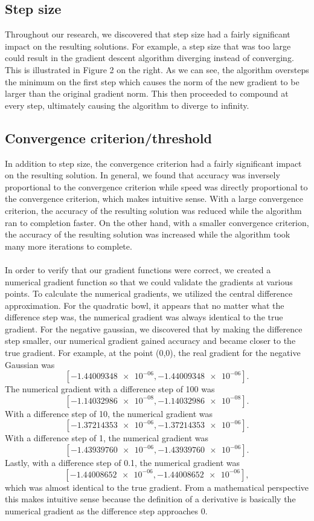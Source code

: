 \documentclass{article}
\begin{document}
\subsection{Step size}
Throughout our research, we discovered that step size had a fairly significant impact on the resulting solutions. For example, a step size that was too large could result in the gradient descent algorithm diverging instead of converging. This is illustrated in Figure 2 on the right. As we can see, the algorithm oversteps the minimum on the first step which causes the norm of the new gradient to be larger than the original gradient norm. This then proceeded to compound at every step, ultimately causing the algorithm to diverge to infinity.

\subsection{Convergence criterion/threshold}
In addition to step size, the convergence criterion had a fairly significant impact on the resulting solution. In general, we found that accuracy was inversely proportional to the convergence criterion while speed was directly proportional to the convergence criterion, which makes intuitive sense. With a large convergence criterion, the accuracy of the resulting solution was reduced while the algorithm ran to completion faster. On the other hand, with a smaller convergence criterion, the accuracy of the resulting solution was increased while the algorithm took many more iterations to complete. \\ \\

In order to verify that our gradient functions were correct, we created a numerical gradient function so that we could validate the gradients at various points. To calculate the numerical gradients, we utilized the central difference approximation. For the quadratic bowl, it appears that no matter what the difference step was, the numerical gradient was always identical to the true gradient. For the negative gaussian, we discovered that by making the difference step smaller, our numerical gradient gained accuracy and became closer to the true gradient. For example, at the point (0,0), the real gradient for the negative Gaussian was $$[ \num{-1.44009348e-06}, \num{-1.44009348e-06}].$$
The numerical gradient with a difference step of 100 was $$[ \num{-1.14032986e-08} , \num{-1.14032986e-08}].$$
With a difference step of 10, the numerical gradient was $$[ \num{-1.37214353e-06},  \num{-1.37214353e-06}].$$
With a difference step of 1, the numerical gradient was $$[ \num{-1.43939760e-06},  \num{-1.43939760e-06}].$$
Lastly, with a difference step of 0.1, the numerical gradient was
$$[ \num{-1.44008652e-06}, \num{-1.44008652e-06}],$$ which was almost identical to the true gradient. From a mathematical perspective this makes intuitive sense because the definition of a derivative is basically the numerical gradient as the difference step approaches 0. \\ \\
\end{document}
